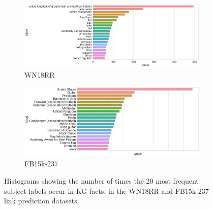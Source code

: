 \bigskip
\bigskip



\begin{figure}[H]
	\begin{subfigure}[b]{.5\linewidth}
   		\centering
    		\includegraphics[width=1.0\linewidth, height=0.7\linewidth]{WN18RR_Subject_Counts}
		\captionsetup{justification=centering}
		\caption{WN18RR}
	\end{subfigure}
	\begin{subfigure}[b]{.5\linewidth}
   		\centering
		\includegraphics[width=1.0\linewidth, height=0.7\linewidth]{FB15k-237_Subject_Counts}
		\captionsetup{justification=centering}
		\caption{FB15k-237}
	\end{subfigure}
	\caption{Histograms showing the number of times the 20 most frequent subject labels occur in KG facts, in the WN18RR and FB15k-237 link prediction datasets.}
\end{figure}

